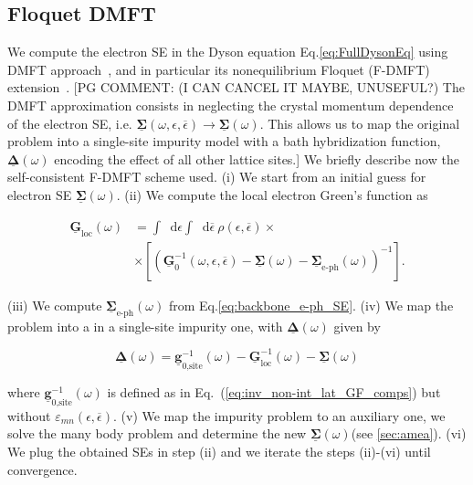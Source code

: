 \documentclass[aps,prb,groupedaddress,showpacs,twocolumn,superscriptaddress,10pt]{revtex4-2}
\newcommand*\dd{\mathop{}\!\mathrm{d}}
\newcommand{\mat}[1]{\bm{#1}} %
\newcommand{\kel}[1]{\underline{#1}} %
\newcommand{\pgcomm}[1]{{\color{ao(english)} [PG COMMENT: #1]}}
\begin{document}
	
\subsection{Floquet DMFT}
\label{sec:FDMFT_implementation}
 

We compute the electron SE in the Dyson equation Eq.\eqref{eq:FullDysonEq} using DMFT approach~\cite{me.vo.89,ge.ko.92,ge.ko.96}, and in particular its nonequilibrium Floquet (F-DMFT) extension~\cite{ts.ok.08,sc.mo.02u,jo.fr.08}. \pgcomm{(I CAN CANCEL IT MAYBE, UNUSEFUL?) The DMFT approximation consists in neglecting the crystal momentum dependence of the electron SE, i.e. $\kel{\mat{\Sigma}}(\omega,\epsilon,\overline{\epsilon}) \to \kel{\mat{\Sigma}}(\omega)$. This allows us to map the original problem into a single-site impurity model with a bath hybridization function, $\kel{\mat\Delta}(\omega)$ encoding the effect of all other lattice sites.} We briefly describe now the self-consistent F-DMFT scheme used.
(i) We start from an initial guess for electron SE $\kel{\mat{\Sigma}}(\omega)$. (ii) We compute the local electron Green's function as 

\begin{equation}\label{eq:Lat_LocGF}
\begin{split}
\kel{\mat G}_{\text{loc}}(\omega) &= \int \dd\epsilon \int \dd\overline{\epsilon} \ \rho(\epsilon,\overline{\epsilon}) \times \\ 
&\times \left[ \left( \kel{\mat G}^{-1}_{0}(\omega,\epsilon,\overline{\epsilon}) - \kel{\mat\Sigma}(\omega) - \kel{\mat \Sigma}_{\text{e-ph}}(\omega) \right)^{-1} \right].
\end{split}
\end{equation}	

(iii) We compute $\kel{\mat{\Sigma}}_{\text{e-ph}}(\omega)$
from Eq.\eqref{eq:backbone_e-ph_SE}.
(iv) We map the problem into a in a single-site impurity one, with $\kel{\mat\Delta}(\omega)$ given by 

\begin{equation}\label{eq:imp_Dyson_eq}
\kel{\mat{\Delta}}(\omega) = \kel{\mat{g}}^{-1}_{\text{0,site}}(\omega) - \kel{\mat{G}}^{-1}_{\text{loc}}(\omega) - \kel{\mat{\Sigma}}(\omega)
\end{equation}

where $\kel{\mat{g}}^{-1}_{\text{0,site}}(\omega)$ is defined as in Eq.~(\ref{eq:inv_non-int_lat_GF_comps}) but without $\varepsilon_{mn}(\epsilon,\overline{\epsilon})$. (v) We map the impurity problem to an auxiliary one, we solve the many body problem and determine the new $\kel{\mat{\Sigma}}(\omega)$(see \ref{sec:amea}). (vi) We plug the obtained SEs in step (ii) and we iterate the steps (ii)-(vi) until convergence.
\end{document}

